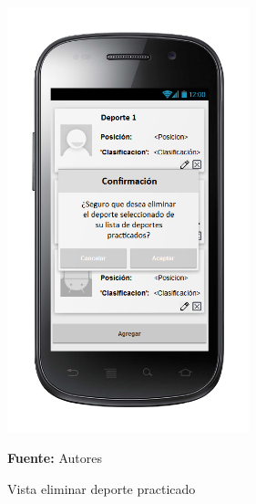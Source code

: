 \begin{figure}[!htb]
  \begin{center}
\includegraphics[width=7cm]{./imagenes/UI/Usuarios/eliminar_deporte_practicado.png}
    \caption{Vista eliminar deporte practicado}
    \label{fig:Vista_eliminar_deporte_practicado}
    \textbf{Fuente:}  Autores
  \end{center}
\end{figure}
